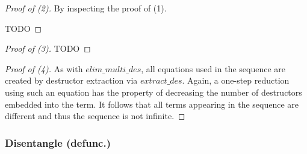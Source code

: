 \documentclass[11pt]{article} %
\begin{document}
\begin{proof}[Proof of (2)] By inspecting the proof of (1).

TODO

\end{proof}

\begin{proof}[Proof of (3)]

TODO

\end{proof}

\begin{proof}[Proof of (4)] As with $elim\_multi\_des$, all equations used in the sequence are created by destructor extraction via $extract\_des$. Again, a one-step reduction using such an equation has the property of decreasing the number of destructors embedded into the term. It follows that all terms appearing in the sequence are different and thus the sequence is not infinite.

\end{proof}

\subsubsection{Disentangle (defunc.)}
\end{document}
